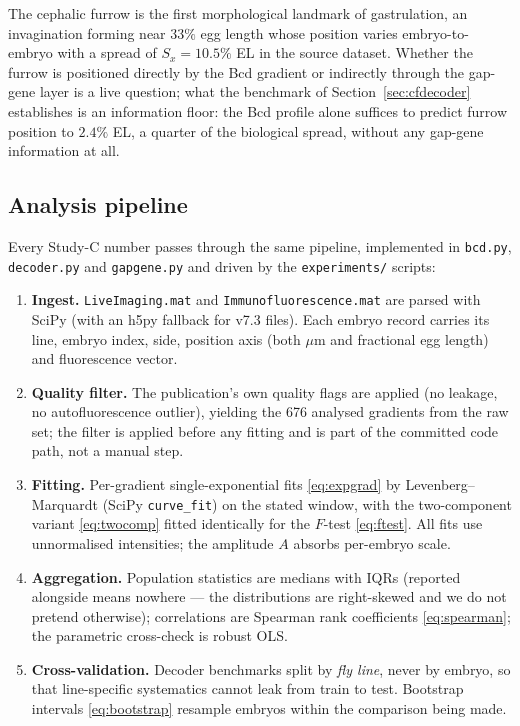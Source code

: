 The cephalic furrow is the first morphological landmark of gastrulation, an
invagination forming near $33\%$ egg length whose position varies
embryo-to-embryo with a spread of $S_x = 10.5\%$ EL in the source dataset.
Whether the furrow is positioned directly by the Bcd gradient or indirectly
through the gap-gene layer is a live question; what the benchmark of
Section~\ref{sec:cfdecoder} establishes is an information floor: the Bcd
profile alone suffices to predict furrow position to $2.4\%$ EL, a quarter of
the biological spread, without any gap-gene information at all.

\subsection{Analysis pipeline}

Every Study-C number passes through the same pipeline, implemented in
\texttt{bcd.py}, \texttt{decoder.py} and \texttt{gapgene.py} and driven by
the \texttt{experiments/} scripts:

\begin{enumerate}
\item \textbf{Ingest.} \texttt{LiveImaging.mat} and
\texttt{Immunofluorescence.mat} are parsed with SciPy (with an h5py fallback
for v7.3 files). Each embryo record carries its line, embryo index, side,
position axis (both $\mu$m and fractional egg length) and fluorescence
vector.
\item \textbf{Quality filter.} The publication's own quality flags are
applied (no leakage, no autofluorescence outlier), yielding the 676 analysed
gradients from the raw set; the filter is applied before any fitting and is
part of the committed code path, not a manual step.
\item \textbf{Fitting.} Per-gradient single-exponential fits
\eqref{eq:expgrad} by Levenberg--Marquardt (SciPy \texttt{curve\_fit}) on the
stated window, with the two-component variant \eqref{eq:twocomp} fitted
identically for the $F$-test \eqref{eq:ftest}. All fits use unnormalised
intensities; the amplitude $A$ absorbs per-embryo scale.
\item \textbf{Aggregation.} Population statistics are medians with IQRs
(reported alongside means nowhere --- the distributions are right-skewed and
we do not pretend otherwise); correlations are Spearman rank coefficients
\eqref{eq:spearman}; the parametric cross-check is robust OLS.
\item \textbf{Cross-validation.} Decoder benchmarks split by \emph{fly line},
never by embryo, so that line-specific systematics cannot leak from train to
test. Bootstrap intervals \eqref{eq:bootstrap} resample embryos within the
comparison being made.
\end{enumerate}

